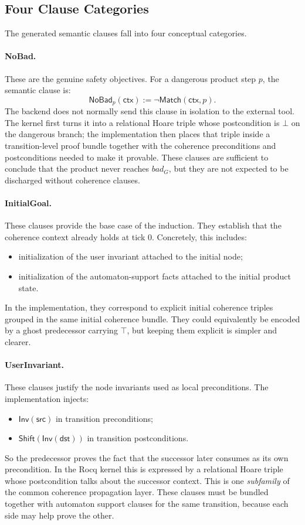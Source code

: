 \documentclass[11pt,a4paper]{article}
\newcommand{\Match}{\mathsf{Match}}
\newcommand{\ctx}{\mathsf{ctx}}
\begin{document}
\subsection{Four Clause Categories}

The generated semantic clauses fall into four conceptual categories.

\paragraph{NoBad.}
These are the genuine safety objectives. For a dangerous product step \(p\), the
semantic clause is:
\[
\mathsf{NoBad}_p(\ctx) := \neg \Match(\ctx,p).
\]
The backend does not normally send this clause in isolation to the external
tool. The kernel first turns it into a relational Hoare triple whose
postcondition is \(\bot\) on the dangerous branch; the implementation then
places that triple inside a transition-level proof bundle together with the
coherence preconditions and postconditions needed to make it provable.
These clauses are sufficient to conclude that the product never reaches
\(bad_G\), but they are not expected to be discharged without coherence clauses.

\paragraph{InitialGoal.}
These clauses provide the base case of the induction. They establish that
the coherence context already holds at tick \(0\). Concretely, this includes:
\begin{itemize}[leftmargin=1.4em]
\item initialization of the user invariant attached to the initial node;
\item initialization of the automaton-support facts attached to the initial
  product state.
\end{itemize}
In the implementation, they correspond to explicit initial coherence triples grouped
in the same initial coherence bundle. They could equivalently be encoded by a
ghost predecessor carrying \(\top\), but keeping them explicit is simpler and
clearer.

\paragraph{UserInvariant.}
These clauses justify the node invariants used as local preconditions. The
implementation injects:
\begin{itemize}[leftmargin=1.4em]
\item \(\mathsf{Inv}(\mathsf{src})\) in transition preconditions;
\item \(\mathsf{Shift}(\mathsf{Inv}(\mathsf{dst}))\) in transition
  postconditions.
\end{itemize}
So the predecessor proves the fact that the successor later consumes as
its own precondition. In the Rocq kernel this is expressed by a relational
Hoare triple whose postcondition talks about the successor context. This is one
\emph{subfamily} of the common coherence propagation layer. These clauses must be
bundled together with automaton
support clauses for the same transition, because each side may help prove the
other.
\end{document}
